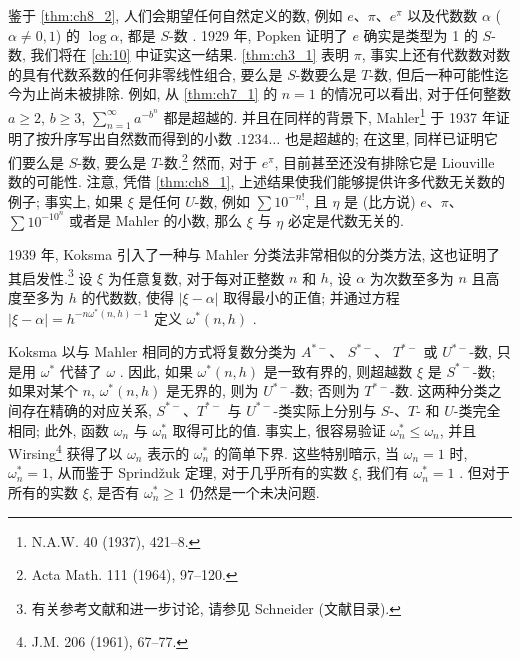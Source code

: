 鉴于 \autoref{thm:ch8_2}, 人们会期望任何自然定义的数, 例如 $e$、$\pi$、$e^{\pi}$ 以及代数数 $\alpha$ ($\alpha \neq 0, 1$) 的 $\log \alpha$, 都是 $S$-数 . 1929 年, Popken 证明了 $e$ 确实是类型为 1 的 $S$-数, 我们将在 \autoref{ch:10} 中证实这一结果. \autoref{thm:ch3_1} 表明 $\pi$, 事实上还有代数数对数的具有代数系数的任何非零线性组合, 要么是 $S$-数要么是 $T$-数, 但后一种可能性迄今为止尚未被排除. 例如, 从 \autoref{thm:ch7_1} 的 $n = 1$ 的情况可以看出, 对于任何整数 $a \ge 2$, $b \ge 3$, $\sum_{n=1}^{\infty} a^{-b^n}$ 都是超越的. 并且在同样的背景下, Mahler\footnote{N.A.W. 40 (1937), 421--8.} 于 1937 年证明了按升序写出自然数而得到的小数 $.1234 \dots$ 也是超越的; 在这里, 同样已证明它们要么是 $S$-数, 要么是 $T$-数.\footnote{Acta Math. 111 (1964), 97--120.} 然而, 对于 $e^{\pi}$, 目前甚至还没有排除它是 Liouville 数的可能性. 注意, 凭借 \autoref{thm:ch8_1}, 上述结果使我们能够提供许多代数无关数的例子; 事实上, 如果 $\xi$ 是任何 $U$-数, 例如 $\sum 10^{-n!}$, 且 $\eta$ 是 (比方说) $e$、$\pi$、$\sum 10^{-10^n}$ 或者是 Mahler 的小数, 那么 $\xi$ 与 $\eta$ 必定是代数无关的.

1939 年, Koksma 引入了一种与 Mahler 分类法非常相似的分类方法, 这也证明了其启发性.\footnote{有关参考文献和进一步讨论, 请参见 Schneider (文献目录).} 设 $\xi$ 为任意复数, 对于每对正整数 $n$ 和 $h$, 设 $\alpha$ 为次数至多为 $n$ 且高度至多为 $h$ 的代数数, 使得 $|\xi - \alpha|$ 取得最小的正值; 并通过方程 $|\xi - \alpha| = h^{-n\omega^*(n, h)-1}$ 定义 $\omega^*(n, h)$ .

Koksma 以与 Mahler 相同的方式将复数分类为 $A^{*-}$、 $S^{*-}$、 $T^{*-}$ 或 $U^{*-}$-数, 只是用 $\omega^*$ 代替了 $\omega$ . 因此, 如果 $\omega^{*}(n,h)$ 是一致有界的, 则超越数 $\xi$ 是 $S^{*-}$-数; 如果对某个 $n$, $\omega^{*}(n,h)$ 是无界的, 则为 $U^{*-}$-数; 否则为 $T^{*-}$-数. 这两种分类之间存在精确的对应关系, $S^{*-}$、$T^{*-}$ 与 $U^{*-}$-类实际上分别与 $S$-、$T$- 和 $U$-类完全相同; 此外, 函数 $\omega_{n}$ 与 $\omega_{n}^{*}$ 取得可比的值. 事实上, 很容易验证 $\omega_{n}^{*} \leq \omega_{n}$, 并且 Wirsing\footnote{J.M. 206 (1961), 67--77.} 获得了以 $\omega_{n}$ 表示的 $\omega_{n}^{*}$ 的简单下界. 这些特别暗示, 当 $\omega_{n} = 1$ 时, $\omega_{n}^{*} = 1$, 从而鉴于 Sprindžuk 定理, 对于几乎所有的实数 $\xi$, 我们有 $\omega_{n}^{*} = 1$ . 但对于所有的实数 $\xi$, 是否有 $\omega_{n}^{*} \geqslant 1$ 仍然是一个未决问题.

